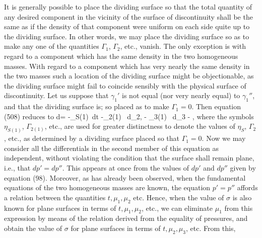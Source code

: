 \documentclass[12pt]{article}
\begin{document}
{It is generally possible to place the dividing surface so that the total quantity of any desired component in the vicinity of the surface of discontinuity shall be the same as if the density of that component were uniform on each side quite up to the dividing surface. In other words, we may place the dividing surface so as to make any one of the quantities $\Gamma_1$, $\Gamma_2$, etc., vanish. The only exception is with regard to a component which has the same density in the two homogeneous masses. With regard to a component which has very nearly the same density in the two masses such a location of the dividing surface might be objectionable, as the dividing surface might fail to coincide sensibly with the physical surface of discontinuity. Let us suppose that $\gamma_1'$ is not equal (nor very nearly equal) to $\gamma_1''$, and that the dividing surface is; so placed as to make $\Gamma_1=0$. Then equation (508) reduces to
\eqs d\sigma = -\eta_{S(1)}\, dt -\Gamma_{2(1)} \, d\mu_2, - \Gamma_{3(1)} \, d\mu_3 - , \label{514}\eqe 
where the symbols $\eta_{S(1)}$, $\Gamma_{2(1)}$, etc., are used for greater distinctness to denote the values of $\eta_S$, $\Gamma_2$, etc., as determined by a dividing surface placed so that $\Gamma_1=0$. Now we may consider all the differentials in the second member of this equation as independent, without violating the condition that the surface shall remain plane, i.e., that $dp'=dp''$. This appears at once from the values of $dp'$ and $dp''$ given by equation (98).  Moreover, as has already been observed, when the fundamental equations of the two homogeneous masses are known, the equation $p'=p''$ affords a relation between the quantities $t, \mu_1, \mu_2$ etc. Hence, when the value of $\sigma$ is also known for plane surfaces in terms of  $t, \mu_1, \mu_2$, etc., we can eliminate $\mu_1$ from  this expression by means of the relation derived from the equality of pressures, and obtain the value of $\sigma$ for plane surfaces in terms of $t, \mu_2,\mu_3$, etc. From  this,
}
\end{document}
